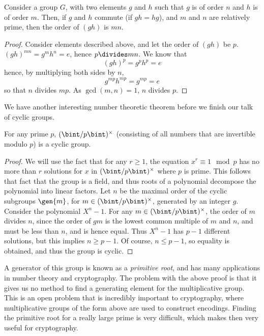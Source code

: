 \begin{theorem}
    Consider a group $G$, with two elements $g$ and $h$ such that $g$ is of order $n$ and $h$ is of order $m$. Then, if $g$ and $h$ commute (if $gh = hg$), and $m$ and $n$ are relatively prime, then the order of $(gh)$ is $mn$.
\end{theorem}
\begin{proof}
    Consider elements described above, and let the order of $(gh)$ be $p$. $(gh)^{mn} = g^mh^n = e$, hence $p \divides mn$. We know that
    \[ (gh)^p = g^ph^p = e \]
    hence, by multiplying both sides by $n$,
    \[ g^{mp}h^{mp} = g^{mp} = e \]
    so that $n$ divides $mp$. As $\gcd(m,n) = 1$, $n$ divides $p$.
\end{proof}

We have another interesting number theoretic theorem before we finish our talk of cyclic groups.

\begin{theorem}
    For any prime $p$, $(\bint/p\bint)^\times$ (consisting of all numbers that are invertible modulo $p$) is a cyclic group.
\end{theorem}
\begin{proof}
    We will use the fact that for any $r \geq 1$, the equation $x^r \equiv 1 \mod{p}$ has no more than $r$ solutions for $x$ in $(\bint/p\bint)^\times$ where $p$ is prime. This follows that fact that the group is a field, and thus roots of a polynomial decompose the polynomial into linear factors. Let $n$ be the maximal order of the cyclic subgroups $\gen{m}$, for $m \in (\bint/p\bint)^\times$, generated by an integer $g$. Consider the polynomial $X^n - 1$. For any $m \in (\bint/p\bint)^\times$, the order of $m$ divides $n$, since the order of $gm$ is the lowest common multiple of $m$ and $n$, and must be less than $n$, and is hence equal. Thus $X^n - 1$ has $p - 1$ different solutions, but this implies $n \geq p - 1$. Of course, $n \leq p - 1$, so equality is obtained, and thus the group is cyclic.
\end{proof}

A generator of this group is known as a \emph{primitive root}, and has many applications in number theory and cryptography. The problem with the above proof is that it gives us no method to find a generating element for the multiplicative group. This is an open problem that is incredibly important to cryptography, where multiplicative groups of the form above are used to construct encodings. Finding the primitive root for a really large prime is very difficult, which makes then very useful for cryptography.



